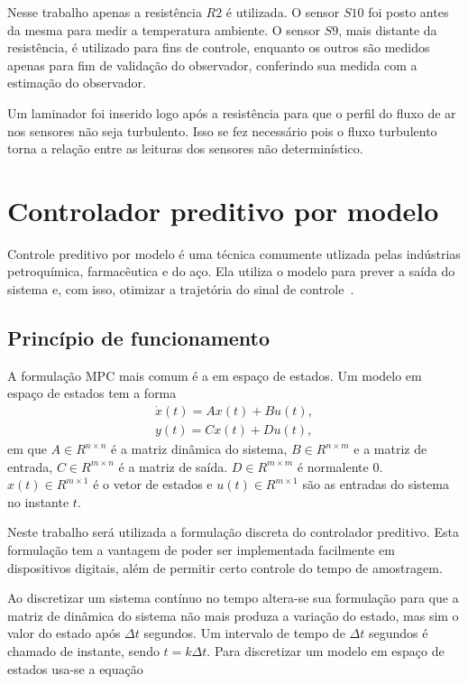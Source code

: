 Nesse trabalho apenas a resistência \(R2\) é utilizada. O sensor \(S10\) foi
posto antes da mesma para medir a temperatura ambiente. O sensor \(S9\), mais
distante da resistência, é utilizado para fins de controle, enquanto os outros
são medidos apenas para fim de validação do observador, conferindo sua medida
com a estimação do observador.

Um laminador foi inserido logo após a resistência para que o perfil do fluxo de
ar nos sensores não seja turbulento. Isso se fez necessário pois o fluxo
turbulento torna a relação entre as leituras dos sensores não determinístico.

\section{Controlador preditivo por modelo}%
\label{sec:mpc}

Controle preditivo por modelo é uma técnica comumente utlizada pelas indústrias
petroquímica, farmacêutica e do aço. Ela utiliza o modelo para prever a saída do
sistema e, com isso, otimizar a trajetória do sinal de
controle~\cite{book:wang}.

\subsection{Princípio de funcionamento}%
\label{subsec:mpc-basic}

A formulação \ac{MPC} mais comum é a em espaço de estados. Um modelo em espaço
de estados tem a forma
%
\begin{equation}
	\label{eq:ss}
	\begin{split}
		\dot{x}(t) = A x(t) + B u(t), \\
		y(t) = C x(t) + Du(t),
	\end{split}
\end{equation}
%
em que \( A \in R^{n \times n} \) é a matriz dinâmica do sistema, \( B \in R^{n
		\times m} \) e a matriz de entrada, \( C \in R^{m \times n} \) é a matriz de
saída. \( D \in R^{m \times m} \) é normalente \( 0 \). \(x(t) \in R^{m \times
		1} \) é o vetor de estados e \( u(t) \in R^{m \times 1} \) são as entradas do
sistema no instante \( t \).

Neste trabalho será utilizada a formulação discreta do controlador preditivo.
Esta formulação tem a vantagem de poder ser implementada facilmente em
dispositivos digitais, além de permitir certo controle do tempo de amostragem.

Ao discretizar um sistema contínuo no tempo altera-se sua formulação para que a
matriz de dinâmica do sistema não mais produza a variação do estado, mas sim o
valor do estado após \( \Delta{}t \) segundos. Um intervalo de tempo de \(
\Delta{}t \) segundos é chamado de instante, sendo \( t = k\Delta{}t \). Para
discretizar um modelo em espaço de estados usa-se a equação


